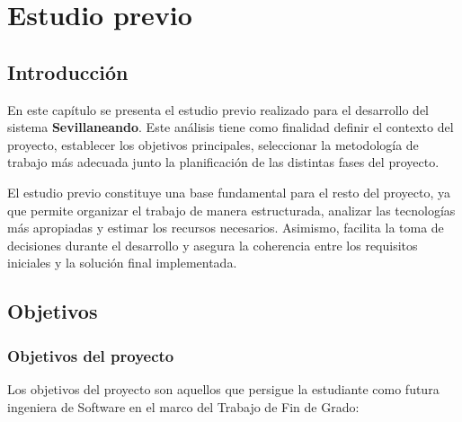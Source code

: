 \chapter{Estudio previo}\label{cap:planificación}

\section{Introducción}

En este capítulo se presenta el estudio previo realizado para el desarrollo del sistema \textbf{Sevillaneando}. Este análisis tiene como finalidad definir el contexto del proyecto, establecer los objetivos principales, seleccionar la metodología de trabajo más adecuada junto la planificación de las distintas fases del proyecto.

El estudio previo constituye una base fundamental para el resto del proyecto, ya que permite organizar el trabajo de manera estructurada, analizar las tecnologías más apropiadas y estimar los recursos necesarios. Asimismo, facilita la toma de decisiones durante el desarrollo y asegura la coherencia entre los requisitos iniciales y la solución final implementada.

\section{Objetivos}

\subsection{Objetivos del proyecto}

Los objetivos del proyecto son aquellos que persigue la estudiante como futura ingeniera de Software en el marco del Trabajo de Fin de Grado:

